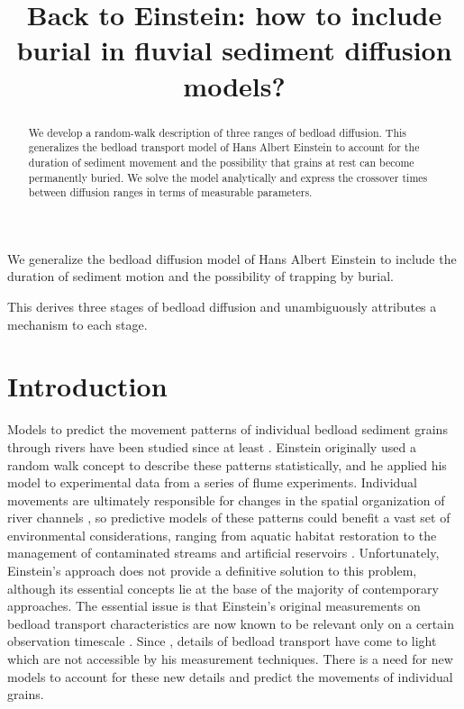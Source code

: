 \documentclass[]{agujournal2018}
\begin{document}
\title{Back to Einstein: how to include burial in fluvial sediment diffusion models?}


\begin{keypoints}
\item We generalize the bedload diffusion model of Hans Albert Einstein to include the duration of sediment motion and the possibility of trapping by burial.
\item This derives three stages of bedload diffusion and unambiguously attributes a mechanism to each stage.
\end{keypoints}

\begin{abstract}
	
We develop a random-walk description of three ranges of bedload diffusion. This generalizes the bedload transport model of Hans Albert Einstein to account for the duration of sediment movement and the possibility that grains at rest can become permanently buried.
We solve the model analytically and express the crossover times between diffusion ranges in terms of measurable parameters.
\end{abstract}

\section{Introduction}

Models to predict the movement patterns of individual bedload sediment grains through rivers have been studied since at least \citet{Einstein1937}.
Einstein originally used a random walk concept to describe these patterns statistically, and he applied his model to experimental data from a series of flume experiments.
Individual movements are ultimately responsible for changes in the spatial organization of river channels \citep{Hassan2017}, so predictive models of these patterns could benefit a vast set of environmental considerations, ranging from aquatic habitat restoration \citep{Hauer2016} to the management of contaminated streams \citep{Macklin2006} and artificial reservoirs \citep{Schleiss2016}.
Unfortunately, Einstein's approach does not provide a definitive solution to this problem, although its essential concepts lie at the base of the majority of contemporary approaches.
The essential issue is that Einstein's original measurements on bedload transport characteristics are now known to be relevant only on a certain observation timescale \citep{Nikora2001a}.
Since \citet{Einstein1937}, details of bedload transport have come to light which are not accessible by his measurement techniques.
There is a need for new models to account for these new details and predict the movements of individual grains.
\end{document}
